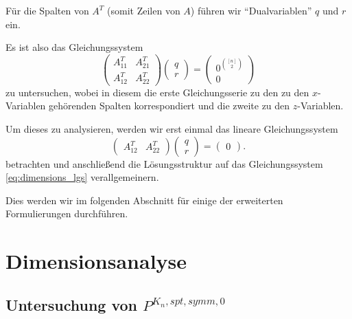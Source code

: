 \documentclass[10p,a4paper,BCOR = 12mm, DIV=15]{scrbook}
\begin{document}
{Für die Spalten von $A^T$ (somit Zeilen von $A$) führen wir "`Dualvariablen"' $q$ und $r$ ein.

Es ist also das Gleichungssystem
\begin{equation}
\left(
\begin{array}{cc}
A_{11}^T & A_{21}^T \\
A_{12}^T & A_{22}^T
\end{array}
\right) \left(
\begin{array}{c}
q \\
r
\end{array}
\right) = 
\left(
\begin{array}{c}
0^{\left[n\right] \choose 2} \\
0
\end{array}
\right) \label{eq:dimensions_lgs}
\end{equation}
zu untersuchen, wobei in diesem die erste Gleichungsserie zu den zu den $x$-Variablen gehörenden Spalten korrespondiert und die zweite zu den $z$-Variablen.

Um dieses zu analysieren, werden wir erst einmal das lineare Gleichungssystem
\begin{displaymath}
\left(
\begin{array}{cc}
A_{12}^T & A_{22}^T
\end{array}
\right) \left(
\begin{array}{c}
q \\
r
\end{array}
\right) = \left(
\begin{array}{c}
0
\end{array}
\right).
\end{displaymath}
betrachten und anschließend die Lösungsstruktur auf das Gleichungssystem \eqref{eq:dimensions_lgs} verallgemeinern.

Dies werden wir im folgenden Abschnitt für einige der erweiterten Formulierungen  durchführen.

\section{Dimensionsanalyse}

\subsection{Untersuchung von $P^{K_n, spt, symm, 0}$}

}
\end{document}
